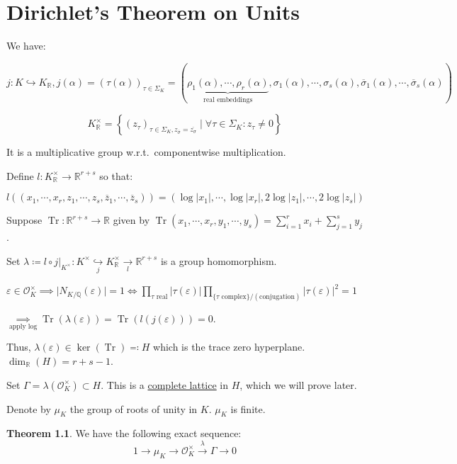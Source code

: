 \documentclass[openany]{amsbook}
\numberwithin{section}{chapter}
\theoremstyle{definition}
\newtheorem{theorem}{Theorem}[chapter]
\newcommand{\Tr}{\operatorname{Tr}}
\begin{document}
\chapter{Dirichlet's Theorem on Units}

We have:

\[
    j : K \hookrightarrow K_{\mathbb{R}}, j(\alpha) = (\tau(\alpha))_{\tau\in \Sigma_K} = (\underbrace{\rho_1(\alpha),\cdots,\rho_r(\alpha)}_{\text{real embeddings}}, \sigma_1(\alpha),\cdots ,\sigma_s(\alpha), \overline{\sigma}_1(\alpha),\cdots,\overline{\sigma}_s(\alpha))
\] 

\[
    K_\mathbb{R}^\times = \left\{ (z_\tau)_{\tau \in \Sigma_K, z_{\overline{\sigma}} = \overline{z_\sigma} } \mid \forall \tau \in \Sigma_K : z_\tau \neq 0 \right\} 
\]

It is a multiplicative group w.r.t.\ componentwise multiplication.

Define \(l:K_{\mathbb{R}}^\times \to \mathbb{R}^{r+s}\) so that:

\[
    l((x_1, \cdots , x_r, z_1, \cdots , z_s, \overline{z}_1, \cdots , \overline{z}_s)) = (\log \vert x_1 \vert , \cdots , \log \vert x_r \vert, 2 \log \vert z_1 \vert, \cdots , 2 \log \vert z_s \vert)
\]

Suppose \(\Tr:\mathbb{R}^{r+s}\to \mathbb{R}\) given by \(\Tr(x_1, \cdots , x_r, y_1, \cdots , y_s) = \sum_{i=1}^r x_i + \sum_{j=1}^s y_j\).

Set \(\lambda \coloneqq l \circ j|_{K^\times} : K^\times \underset{j}{\hookrightarrow} K^\times_\mathbb{R} \underset{l}{\to} \mathbb{R}^{r+s} \) is a group homomorphism.

\(\varepsilon \in \mathcal{O}_K^\times \implies \vert N_{K / \mathbb{Q}}(\varepsilon) \vert = 1 \iff \prod_{\tau \text{ real}} \vert \tau(\varepsilon) \vert \prod_{\{ \tau \text{ complex}  \} / (\text{conjugation}) } \vert \tau (\varepsilon) \vert ^2 = 1 \)

\(\underset{\text{apply log}}{\implies} \Tr (\lambda (\varepsilon)) = \Tr(l(j(\varepsilon))) = 0\).

Thus, \(\lambda (\varepsilon) \in \ker (\Tr) \eqqcolon  H\) which is the trace zero hyperplane. \(\dim_{\mathbb{R}}(H) = r+s-1\).

Set \(\Gamma = \lambda(\mathcal{O}_K^\times) \subset H\). This is a \underline{complete lattice} in \(H\), which we will prove later.

Denote by \(\mu_K\) the group of roots of unity in \(K\). \(\mu_K\) is finite.

\begin{theorem} We have the following exact sequence:
    \[
        1 \to \mu_K \to \mathcal{O}_K^\times \overset{\lambda}{\to} \Gamma \to 0
    \]
\end{theorem}
\end{document}
